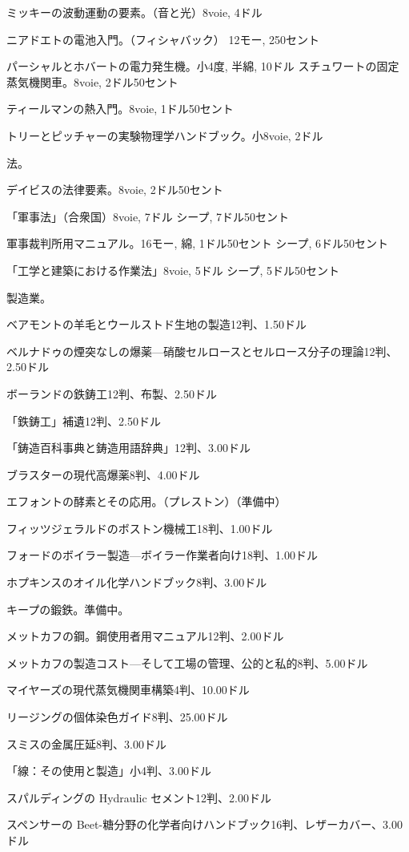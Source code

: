\documentclass[a4paper,11pt,openany]{ltjsbook}
\begin{document}
ミッキーの波動運動の要素。（音と光）8voie, 4ドル

ニアドエトの電池入門。（フィシャバック）
12モー, 250セント

パーシャルとホバートの電力発生機。小4度, 半綿, 10ドル
スチュワートの固定蒸気機関車。8voie, 2ドル50セント

ティールマンの熱入門。8voie, 1ドル50セント

トリーとピッチャーの実験物理学ハンドブック。小8voie, 2ドル

法。

デイビスの法律要素。8voie, 2ドル50セント

「軍事法」（合衆国）8voie, 7ドル
シープ, 7ドル50セント

軍事裁判所用マニュアル。16モー, 綿, 1ドル50セント
シープ, 6ドル50セント

「工学と建築における作業法」8voie, 5ドル
シープ, 5ドル50セント

製造業。

ベアモントの羊毛とウールストド生地の製造12判、1.50ドル

ベルナドゥの煙突なしの爆薬—硝酸セルロースとセルロース分子の理論12判、2.50ドル

ボーランドの鉄鋳工12判、布製、2.50ドル

「鉄鋳工」補遺12判、2.50ドル

「鋳造百科事典と鋳造用語辞典」12判、3.00ドル

ブラスターの現代高爆薬8判、4.00ドル

エフォントの酵素とその応用。（プレストン）（準備中）

フィッツジェラルドのボストン機械工18判、1.00ドル

フォードのボイラー製造—ボイラー作業者向け18判、1.00ドル

ホプキンスのオイル化学ハンドブック8判、3.00ドル

キープの鍛鉄。準備中。

メットカフの鋼。鋼使用者用マニュアル12判、2.00ドル

メットカフの製造コスト—そして工場の管理、公的と私的8判、5.00ドル

マイヤーズの現代蒸気機関車構築4判、10.00ドル

リージングの個体染色ガイド8判、25.00ドル

スミスの金属圧延8判、3.00ドル

「線：その使用と製造」小4判、3.00ドル

スパルディングの Hydraulic セメント12判、2.00ドル

スペンサーの Beet-糖分野の化学者向けハンドブック16判、レザーカバー、3.00ドル
\end{document}
